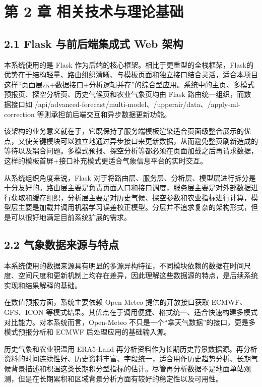 \section{第 2 章 相关技术与理论基础}

\subsection{2.1 Flask 与前后端集成式 Web 架构}

本系统使用的是 Flask 作为后端的核心框架。相比于更重型的全栈框架，Flask的优势在于结构轻量、路由组织清晰、与模板页面和独立接口结合灵活，适合本项目这样“页面展示+数据接口+分析逻辑并存”的综合型应用。系统中的主页、多模式预报页、探空分析页、历史气候页和农业气象页均由 Flask 路由统一组织，而数据接口如 /api/advanced-forecast/multi-model、/upperair/data、/apply-ml-correction 等则承担前后端交互和异步数据更新功能。

该架构的业务意义就在于，它既保持了服务端模板渲染适合页面级整合展示的优点，又使关键模块可以独立地通过异步接口来更新数据，从而避免整页刷新造成的等待以及耦合问题。多模式预报、探空分析等都必须在页面加载之后再请求数据，这样的模板首屏+接口补充模式更适合气象信息平台的实时交互。

从系统组织角度来说，Flask 对于将路由层、服务层、分析层、模型层进行拆分是十分友好的。路由层主要是负责页面入口和接口调度，服务层主要是对外部数据进行获取和缓存组织，分析层主要是对历史气候、探空参数和农业指标进行计算，模型层主要是加载并调用机器学习误差校正模型。分层并不追求复杂的架构形式，但是可以很好地满足目前系统扩展的需求。

\subsection{2.2 气象数据来源与特点}

本系统使用的数据来源具有明显的多源异构特征，不同模块依赖的数据在时间尺度、空间尺度和更新机制上均存在差异，因此理解这些数据源的特点，是后续系统实现和结果解释的基础。

在数值预报方面，系统主要依赖 Open-Meteo 提供的开放接口获取 ECMWF、GFS、ICON 等模式结果。其优点在于调用便捷、格式统一、适合快速构建多模式对比能力。对本系统而言，Open-Meteo 不只是一个“拿天气数据”的接口，更是多模式预报分析和 ECMWF 后处理应用的基础输入源。

历史气象和农业积温用 ERA5-Land 再分析资料作为长期历史背景数据源。再分析资料的时间连续性好、历史资料丰富、字段统一，适合用作历史趋势分析、长期气候背景描述和积温这类长期积分型指标的估计。尽管再分析数据不是地面单站观测，但是在长期累积和区域背景分析方面有较好的稳定性以及可用性。

